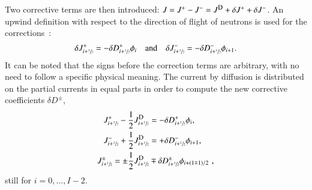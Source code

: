 Two corrective terms are then introduced: $J = \jp - \jm = \jD + \delta J^+ + \delta J^-$. An upwind definition with respect to the direction of flight of neutrons is used for the corrections~\cite{Jarrett-2016,Zhu-2016}:
\begin{equation}
  \label{eq:CCF-sub}
  \delta J^+ _{i+\sfrac{1}{2}} = -\delta D^+ _{i+\sfrac{1}{2}} \phi_i
  \quad \text{and} \quad
  \delta J^- _{i+\sfrac{1}{2}} = -\delta D^- _{i+\sfrac{1}{2}} \phi_{i+1}.
\end{equation}
It can be noted that the signs before the correction terms are arbitrary, with no need to follow a specific physical meaning. 
%
%
The current by diffusion is distributed on the partial currents in equal parts in order to compute the new corrective coefficients $\delta D^{\pm}$,
\begin{subequations}
  \label{eq:delta-D-pCMFD}
  \begin{align}
    J^+_{i+\hzi} - \frac{1}{2}\jD_{i+\hzi} &= -\delta D^+_{i+\hzi} \phi_i, \label{eq:delta-D-pCMFDp}\\
    J^-_{i+\hzi} + \frac{1}{2}\jD_{i+\hzi} &= +\delta D^-_{i+\hzi} \phi_{i+1}, \label{eq:delta-D-pCMFDm} \\
    J^\pm_{i+\hzi} = \pm \frac{1}{2}\jD_{i+\hzi}& \mp \delta D^{\pm} _{i+\hzi} \phi_{i+(1\mp 1)/2}\label{eq:delta-D-pCMFDpm} \,\,,
  \end{align}
\end{subequations}
still for $i=0, \ldots, I-2$.
%
%
